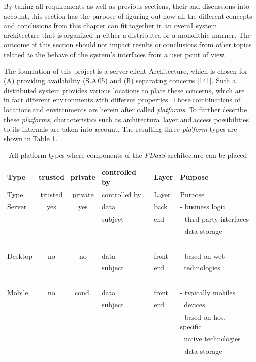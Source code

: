 \documentclass[12pt,english,a4paper,titlepage,cleardoublepage=empty,dottedtoc]{report}
\begin{document}
By taking all requirements as well as previous sections, their and
discussions into account, this section has the purpose of figuring out
how all the different concepts and conclusions from this chapter can fit
together in an overall system architecture that is organized in either a
distributed or a monolithic manner. The outcome of this section should
not impact results or conclusions from other topics related to the
behave of the system's interfaces from a user point of view.

The foundation of this project is a server-client Architecture, which is
chosen for (A) providing availability (\protect\hyperlink{sa05}{S.A.05})
and (B) separating concerns
{[}\protect\hyperlink{ref-web_2016_wikipedia_separation-of-concerns}{141}{]}.
Such a distributed system provides various locations to place these
concerns, which are in fact different environments with different
properties. Those combinations of locations and environments are herein
after called \emph{platforms}. To further describe these
\emph{platforms}, characteristics such as architectural layer and access
possibilities to its internals are taken into account. The resulting
three \emph{platform} types are shown in Table
\ref{tbl:platforms-characteristics}.

\begin{longtable}[]{@{}lcclll@{}}
\caption{All platform types where components of the \emph{PDaaS}
architecture can be placed
\label{tbl:platforms-characteristics}}\tabularnewline
\toprule
Type & trusted & private & controlled by & Layer &
Purpose\tabularnewline
\midrule
\endfirsthead
\toprule
Type & trusted & private & controlled by & Layer &
Purpose\tabularnewline
\midrule
\endhead
Server & yes & yes & data & back & - business logic\tabularnewline
\(\ \) & \(\ \) & \(\ \) & subject & end & - third-party
interfaces\tabularnewline
\(\ \) & \(\ \) & \(\ \) & \(\ \) & \(\ \) & - data
storage\tabularnewline
\(\ \) & \(\ \) & \(\ \) & \(\ \) & \(\ \) & \(\ \)\tabularnewline
Desktop & no & no & data & front & - based on web\tabularnewline
\(\ \) & \(\ \) & \(\ \) & subject & end & \(\ \)
technologies\tabularnewline
\(\ \) & \(\ \) & \(\ \) & \(\ \) & \(\ \) & \(\ \)\tabularnewline
Mobile & no & cond. & data & front & - typically mobiles\tabularnewline
\(\ \) & \(\ \) & \(\ \) & subject & end & \(\ \) devices\tabularnewline
\(\ \) & \(\ \) & \(\ \) & \(\ \) & \(\ \) & - based on
host-specific\tabularnewline
\(\ \) & \(\ \) & \(\ \) & \(\ \) & \(\ \) & \(\ \) native
technologies\tabularnewline
\(\ \) & \(\ \) & \(\ \) & \(\ \) & \(\ \) & - data
storage\tabularnewline
\bottomrule
\end{longtable}
\end{document}
